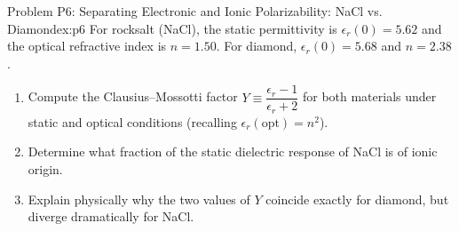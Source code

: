 \documentclass[11pt,a4paper]{article}
\begin{document}
\vspace{0.4cm}

\begin{examplebox}{Problem P6: Separating Electronic and Ionic Polarizability: NaCl vs. Diamond}{ex:p6}
For rocksalt (NaCl), the static permittivity is $\epsilon_r(0) = 5.62$ and the optical refractive index is $n = 1.50$. For diamond, $\epsilon_r(0) = 5.68$ and $n = 2.38$.
\begin{enumerate}[label=(\alph*), leftmargin=*]
    \item Compute the Clausius--Mossotti factor $Y \equiv \dfrac{\epsilon_r - 1}{\epsilon_r + 2}$ for both materials under static and optical conditions (recalling $\epsilon_r(\text{opt}) = n^2$).
    \item Determine what fraction of the static dielectric response of NaCl is of ionic origin.
    \item Explain physically why the two values of $Y$ coincide exactly for diamond, but diverge dramatically for NaCl.
\end{enumerate}
\end{examplebox}
\end{document}
